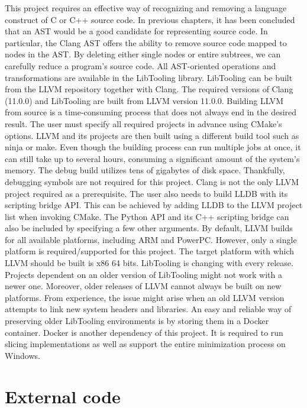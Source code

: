 This project requires an effective way of recognizing and removing a language 
construct of C or C++ source code.
In previous chapters, it has been concluded that an AST would be a good 
candidate for representing source code.
In particular, the Clang AST offers the ability to remove source code mapped 
to nodes in the AST.
By deleting either single nodes or entire subtrees, we can carefully reduce 
a program's source code.
All AST-oriented operations and transformations are available in 
the LibTooling library.
LibTooling can be built from the LLVM repository together with Clang.
The required versions of Clang (11.0.0) and LibTooling are built from LLVM 
version 11.0.0.
Building LLVM from source is a time-consuming process that does not always 
end in the desired result.
The user must specify all required projects in advance using CMake's options.
LLVM and its projects are then built using a different build tool such as 
ninja or make.
Even though the building process can run multiple jobs at once, it can still 
take up to several hours, consuming a significant amount of the system's 
memory.
The debug build utilizes tens of gigabytes of disk space.
Thankfully, debugging symbols are not required for this project.
Clang is not the only LLVM project required as a prerequisite.
 The user also needs to build LLDB with its scripting bridge API.
This can be achieved by adding LLDB to the LLVM project list when invoking 
CMake.
The Python API and its C++ scripting bridge can also be included by 
specifying a few other arguments.
By default, LLVM builds for all available platforms, including ARM and 
PowerPC.
However, only a single platform is required/supported for this project.
The target platform with which LLVM should be built is x86 64 bits.
LibTooling is changing with every release.
Projects dependent on an older version of LibTooling might not work with 
a newer one.
Moreover, older releases of LLVM cannot always be built on new platforms.
From experience, the issue might arise when an old LLVM version attempts 
to link new system headers and libraries.
An easy and reliable way of preserving older LibTooling environments is by 
storing them in a Docker container.
Docker is another dependency of this project.
It is required to run slicing implementations as well as support the entire 
minimization process on Windows.

\section{External code}

